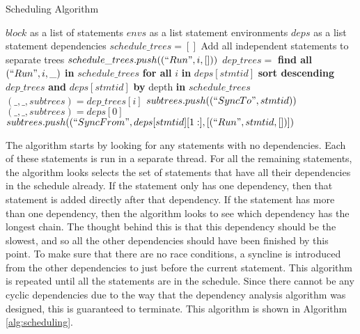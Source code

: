 \begin{algorithm}[H]
\caption{Scheduling Algorithm}
\label{alg:scheduling}
\begin{algorithmic}[1]
    \Require $block$ as a list of statements
    \Require $envs$ as a list statement environments
    \Require $deps$ as a list statement dependencies
    \State $schedule\_trees = []$
     \Comment Add all independent statements to separate trees
            \State $schedule\_trees.push((``Run", i, []))$
        \EndIf
    \EndFor
                \State $dep\_trees =$ \textbf{find all} $(``Run", i, \_)$ \textbf{in} $schedule\_trees$ \textbf{for all} $i$ \textbf{in} $deps[stmtid]$
                \State \textbf{sort descending} $dep\_trees$ \textbf{and} $deps[stmtid]$ \textbf{by} depth \textbf{in} $schedule\_trees$
                    \State $(\_,\_,subtrees) = dep\_trees[i]$
                    \State $subtrees.push((``SyncTo", stmtid))$
                \EndFor
                \State $(\_,\_,subtrees) = deps[0]$
                \State $subtrees.push((``SyncFrom", deps[stmtid][1:], [(``Run", stmtid, [])])$
            \EndIf
        \EndFor
    \EndWhile
\end{algorithmic}
\end{algorithm}

The algorithm starts by looking for any statements with no dependencies. Each of these statements is run in a separate thread. For all the remaining statements, the algorithm looks selects the set of statements that have all their dependencies in the schedule already. If the statement only has one dependency, then that statement is added directly after that dependency. If the statement has more than one dependency, then the algorithm looks to see which dependency has the longest chain. The thought behind this is that this dependency should be the slowest, and so all the other dependencies should have been finished by this point. To make sure that there are no race conditions, a syncline is introduced from the other dependencies to just before the current statement. This algorithm is repeated until all the statements are in the schedule. Since there cannot be any cyclic dependencies due to the way that the dependency analysis algorithm was designed, this is guaranteed to terminate. This algorithm is shown in Algorithm \autoref{alg:scheduling}.
